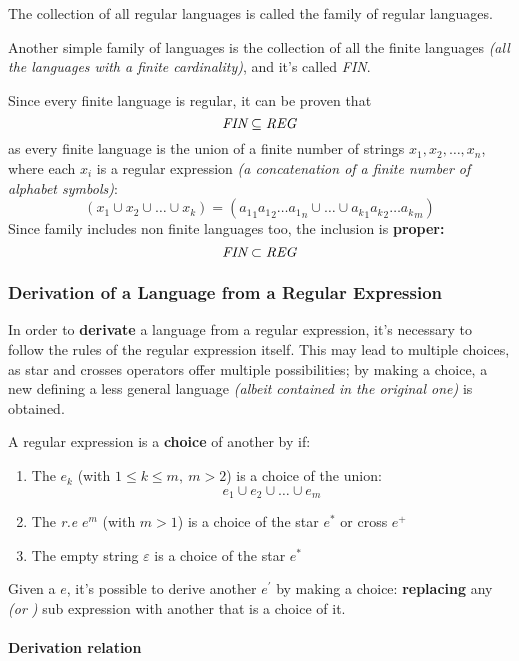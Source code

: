 \documentclass[english]{article}
\begin{document}
The collection of all regular languages is called the family \REG of regular languages.

Another simple family of languages is the collection of all the finite languages \textit{(all the languages with a finite cardinality)}, and it's called \textit{FIN}.

Since every finite language is regular, it can be proven that
\[ \textit{FIN} \subseteq \textit{REG} \]
as every finite language is the union of a finite number of strings \(x_1, x_2, \ldots, x_n\), where each \(x_i\) is a regular expression \textit{(a concatenation of a finite number of alphabet symbols)}:
\[ \left(x_1 \cup x_2 \cup \ldots \cup x_k \right) = \left({a_1}_1 {a_1}_2 \ldots {a_1}_n \cup \ldots \cup {a_k}_1 {a_k}_2 \ldots {a_k}_m \right) \]
Since family \REG includes non finite languages too, the inclusion is \textbf{proper:}
\[ \textit{FIN} \subset \textit{REG} \]

\subsubsection{Derivation of a Language from a Regular Expression}

In order to \textbf{derivate} a language from a regular expression, it's necessary to follow the rules of the regular expression itself.
This may lead to multiple choices, as star and crosses operators offer multiple possibilities;
by making a choice, a new \re defining a less general language \textit{(albeit contained in the original one)} is obtained.

A regular expression is a \textbf{choice} of another by if:

\begin{enumerate}
  \item The \re \(e_k\) (with \(1 \leq k \leq m, \ m > 2\)) is a choice of the union: \[ e_1 \cup e_2 \cup \ldots \cup e_m \]
  \item The \textit{r.e} \(e^m\) (with \(m > 1\)) is a choice of the star \(e^\ast\) or cross \(e^+\)
  \item The empty string \(\varepsilon\) is a choice of the star \(e^\ast\)
\end{enumerate}

Given a \re \(e\), it's possible to derive another \re \(e^\prime\) by making a choice:
\textbf{replacing} any  \textit{(or )} sub expression with another that is a choice of it.

\paragraph{Derivation relation}
\end{document}

